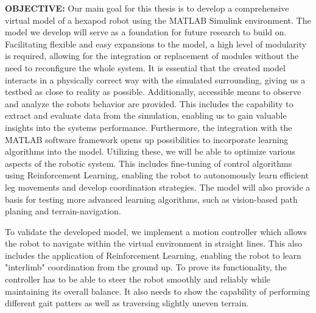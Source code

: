 \textbf{OBJECTIVE:}
Our main goal for this thesis is to develop a comprehensive virtual model of a hexapod robot using the MATLAB Simulink\textsuperscript{\textregistered} environment.
The model we develop will serve as a foundation for future research to build on.
Facilitating flexible and easy expansions to the model, a high level of modularity is required, allowing for the integration or replacement of modules without the need to reconfigure the whole system.
It is essential that the created model interacts in a physically correct way with the simulated surrounding, giving us a testbed as close to reality as possible.
Additionally, accessible means to observe and analyze the robots behavior are provided.
This includes the capability to extract and evaluate data from the simulation, enabling us to gain valuable insights into the systems performance.
Furthermore, the integration with the MATLAB software framework opens up possibilities to incorporate learning algorithms into the model.
Utilizing these, we will be able to optimize various aspects of the robotic system. 
This includes fine-tuning of control algorithms using Reinforcement Learning, enabling the robot to autonomously learn efficient leg movements and develop coordination strategies.
The model will also provide a basis for testing more advanced learning algorithms, such as vision-based path planing and terrain-navigation.

To validate the developed model, we implement a motion controller which allows the robot to navigate within the virtual environment in straight lines. This also includes the application of Reinforcement Learning, enabling the robot to learn "interlimb" coordination from the ground up.
To prove its functionality, the controller has to be able to steer the robot smoothly and reliably while maintaining its overall balance.
It also needs to show the capability of performing different gait patters as well as traversing slightly uneven terrain.



